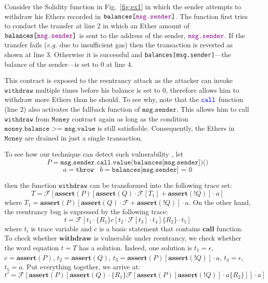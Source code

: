\documentclass[runningheads]{llncs}
\begin{document}
Consider the Solidity function in Fig.~\ref{fig:ex1} in which the sender attempts to withdraw his Ethers recorded in $\texttt{balances[{\color{violet}msg.sender}]}$. The function first tries to conduct the transfer at line 2 in which an Ether amount of $\texttt{balances[{\color{violet}msg.sender}]}$ is sent to the address of the sender, ${\color{violet} \texttt{msg.sender}}$. If the transfer fails (\emph{e.g.} due to insufficient gas) then the transaction is reverted as shown at line 3. Otherwise it is successful and \texttt{balances[{\color{violet}msg.sender}]}---the balance of the sender---is set to 0 at line 4. 

This contract is exposed to the reentrancy attack as the attacker can invoke $\texttt{withdraw}$ multiple times before his balance is set to 0, therefore allows him to withdraw more Ethers than he should. To see why, note that the $\color{blue}\texttt{call}$ function (line 2) also activates the fallback function of $\texttt{msg.sender}$. This allows him to call $\texttt{withdraw}$ from $\texttt{Money}$ contract again as long as the condition $\texttt{money.balance >= msg.value}$ is still satisfiable. Consequently, the Ethers in $\texttt{Money}$ are drained in just a single transaction.

To see how our technique can detect such vulnerability , let 
\\
$$P = \texttt{msg.sender.call.value(balances[msg.sender])()}$$
$$
a = \texttt{throw}~~~~b = \texttt{balances[msg.sender] = 0}
$$

then the function $\texttt{withdraw}$ can be transformed into the following trace set:
$$
T = \mathcal{F}[\textbf{assert}(P)[\textbf{assert}(Q) \cdot \mathcal{F}[T_1]+\textbf{assert}(!Q)] \cdot a]
$$
where $T_1 = \textbf{assert}(P)[\textbf{assert}(Q) \cdot \mathcal{F}+\textbf{assert}(!Q)] \cdot a$. On the other hand, the reentrancy bug is expressed by the following trace:
$$
t = \mathcal{F}[t_1 \cdot \{R_1\}c[t_2 \cdot \mathcal{F}[t_3] \cdot t_4]\{R_2\} \cdot t_5]
$$
where  $t_i$ is trace variable and  $c$ is a basic statement that contains $\textbf{call}$ function. To check whether $\textbf{withdraw}$ is vulnerable under reentrancy, we check whether the word equation $t = T$ has a solution. Indeed, one solution is $t_1 = \epsilon$, $c = \textbf{assert}(P)$, $t_2 = \textbf{assert}(Q)$, $t_3 = \textbf{assert}(P)[\textbf{assert}(!Q)] \cdot a$, $t_4 = \epsilon$, $t_5 = a$. Put everything together, we arrive at:
$$
t' = \mathcal{F}[\textbf{assert}(P)[\textbf{assert}(Q) \cdot \{R_1\}\mathcal{F}[\textbf{assert}(P)[\textbf{assert}(!Q)] \cdot a\{R_2\}]] \cdot a]
$$
\end{document}
